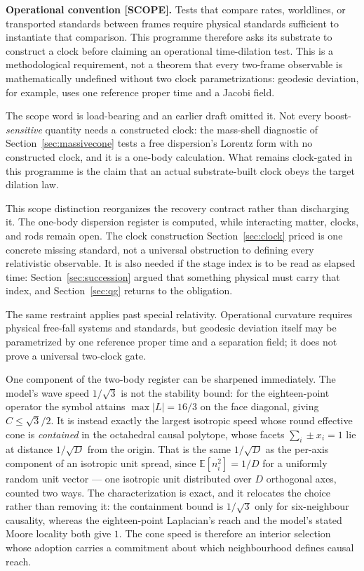 \documentclass[11pt,a4paper]{article}
\theoremstyle{definition}
\theoremstyle{plain}
\theoremstyle{remark}
\begin{document}
\begin{scopebox}
\label{scope:clockstandards}
\textbf{Operational convention [SCOPE].} Tests that compare rates,
worldlines, or transported standards between frames require physical
standards sufficient to instantiate that comparison. This programme
therefore asks its substrate to construct a clock before claiming an
operational time-dilation test. This is a methodological requirement, not
a theorem that every two-frame observable is mathematically undefined
without two clock parametrizations: geodesic deviation, for example, uses
one reference proper time and a Jacobi field.
\end{scopebox}

\noindent The scope word is load-bearing and an earlier draft omitted it.
Not every boost-\emph{sensitive} quantity needs a constructed clock: the
mass-shell diagnostic of Section~\ref{sec:massivecone} tests a free
dispersion's Lorentz form with no constructed clock, and it is a one-body
calculation. What remains clock-gated
in this programme is the claim that an actual substrate-built clock obeys
the target dilation law.

\noindent This scope distinction reorganizes the recovery contract
rather than discharging it. The one-body dispersion register is computed,
while interacting matter, clocks, and rods remain open. The clock
construction Section~\ref{sec:clock} priced is one concrete missing
standard, not a universal obstruction to defining every relativistic
observable. It is also needed if the stage index is to be read as elapsed
time: Section~\ref{sec:succession} argued that something physical must
carry that index, and Section~\ref{sec:qg} returns to the obligation.

The same restraint applies past special relativity. Operational curvature
requires physical free-fall systems and standards, but geodesic deviation
itself may be parametrized by one reference proper time and a separation
field; it does not prove a universal two-clock gate.

One component of the two-body register can be sharpened immediately. The
model's wave speed $1/\sqrt3$ is not the stability bound: for the
eighteen-point operator the symbol attains $\max|L| = 16/3$ on the face
diagonal, giving $C \le \sqrt3/2$. It is instead exactly the largest
isotropic speed whose round effective cone is \emph{contained} in the octahedral
causal polytope, whose facets $\sum_i \pm x_i = 1$ lie at distance
$1/\sqrt{D}$ from the origin. That is the same $1/\sqrt{D}$ as the
per-axis component of an isotropic unit spread, since
$\mathbb{E}[n_i^2] = 1/D$ for a uniformly random unit vector --- one
isotropic unit distributed over $D$ orthogonal axes, counted two ways.
The characterization is exact, and it relocates the choice rather than
removing it: the containment bound is $1/\sqrt3$ only for six-neighbour
causality, whereas the eighteen-point Laplacian's reach and the model's
stated Moore locality both give $1$. The cone speed is therefore an
interior selection whose adoption carries a commitment about which
neighbourhood defines causal reach.
\end{document}
